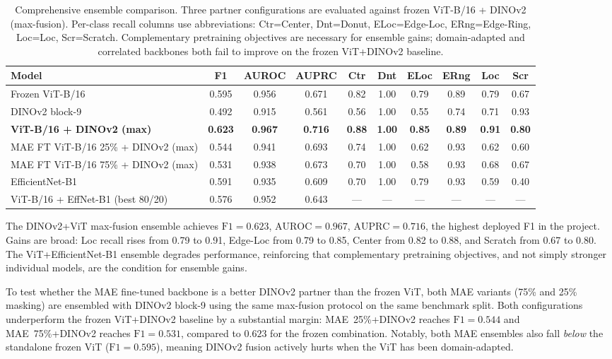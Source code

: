 \documentclass[11pt]{article}
\begin{document}
\begin{table}[H]
\centering
\caption{Comprehensive ensemble comparison. Three partner configurations are evaluated against frozen ViT-B/16 + DINOv2 (max-fusion). Per-class recall columns use abbreviations: Ctr=Center, Dnt=Donut, ELoc=Edge-Loc, ERng=Edge-Ring, Loc=Loc, Scr=Scratch. Complementary pretraining objectives are necessary for ensemble gains; domain-adapted and correlated backbones both fail to improve on the frozen ViT+DINOv2 baseline.}
\label{tab:ensemble_results}
\begin{tabularx}{\linewidth}{>{\raggedright\arraybackslash}Xccccccccc}
\toprule
Model & F1 & AUROC & AUPRC & Ctr & Dnt & ELoc & ERng & Loc & Scr \\
\midrule
Frozen ViT-B/16  & 0.595 & 0.956 & 0.671 & 0.82 & 1.00 & 0.79 & 0.89 & 0.79 & 0.67 \\
DINOv2 block-9   & 0.492 & 0.915 & 0.561 & 0.56 & 1.00 & 0.55 & 0.74 & 0.71 & 0.93 \\
\textbf{ViT-B/16 + DINOv2 (max)} & \textbf{0.623} & \textbf{0.967} & \textbf{0.716} & \textbf{0.88} & \textbf{1.00} & \textbf{0.85} & \textbf{0.89} & \textbf{0.91} & \textbf{0.80} \\
\midrule
MAE FT ViT-B/16 25\% + DINOv2 (max) & 0.544 & 0.941 & 0.693 & 0.74 & 1.00 & 0.62 & 0.93 & 0.62 & 0.60 \\
MAE FT ViT-B/16 75\% + DINOv2 (max) & 0.531 & 0.938 & 0.673 & 0.70 & 1.00 & 0.58 & 0.93 & 0.68 & 0.67 \\
\midrule
EfficientNet-B1  & 0.591 & 0.935 & 0.609 & 0.70 & 1.00 & 0.79 & 0.93 & 0.59 & 0.40 \\
ViT-B/16 + EffNet-B1 (best 80/20) & 0.576 & 0.952 & 0.643 & --- & --- & --- & --- & --- & --- \\
\bottomrule
\end{tabularx}
\end{table}

The DINOv2+ViT max-fusion ensemble achieves $\mathrm{F1}=0.623$, $\mathrm{AUROC}=0.967$, $\mathrm{AUPRC}=0.716$, the highest deployed F1 in the project. Gains are broad: Loc recall rises from 0.79 to 0.91, Edge-Loc from 0.79 to 0.85, Center from 0.82 to 0.88, and Scratch from 0.67 to 0.80. The ViT+EfficientNet-B1 ensemble degrades performance, reinforcing that complementary pretraining objectives, and not simply stronger individual models, are the condition for ensemble gains.

To test whether the MAE fine-tuned backbone is a better DINOv2 partner than the frozen ViT, both MAE variants (75\% and 25\% masking) are ensembled with DINOv2 block-9 using the same max-fusion protocol on the same benchmark split. Both configurations underperform the frozen ViT+DINOv2 baseline by a substantial margin: MAE~25\%+DINOv2 reaches $\mathrm{F1}=0.544$ and MAE~75\%+DINOv2 reaches $\mathrm{F1}=0.531$, compared to $0.623$ for the frozen combination. Notably, both MAE ensembles also fall \emph{below} the standalone frozen ViT ($\mathrm{F1}=0.595$), meaning DINOv2 fusion actively hurts when the ViT has been domain-adapted.
\end{document}

